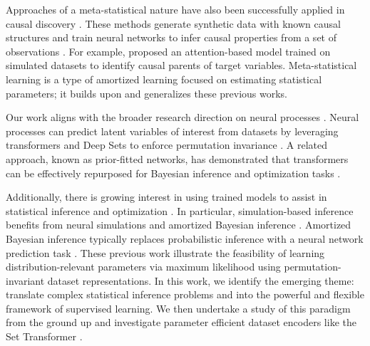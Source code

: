 Approaches of a meta-statistical nature have also been successfully applied in causal discovery \cite{lopez2015towards, lowe2022amortized, lorch2022amortized, wu2024sample}. These methods generate synthetic data with known causal structures and train neural networks to infer causal properties from a set of observations \cite{kelearning}. For example, \citet{kim2024targeted} proposed an attention-based model trained on simulated datasets to identify causal parents of target variables. Meta-statistical learning is a type of amortized learning focused on estimating statistical parameters; it builds upon and generalizes these previous works. 

Our work aligns with the broader research direction on neural processes \cite{garnelo2018neural, garnelo2018conditional,kim2019attentive, Gordon:2020, markou2022practical, huang2023practical, BruinsmaMRFAVBH23}. Neural processes can predict latent variables of interest from datasets \cite{chang2025amortized} by leveraging transformers \cite{pmlr-v162-nguyen22b} and Deep Sets \cite{NIPS2017_f22e4747} to enforce permutation invariance \cite{JMLR:v21:19-322}. A related approach, known as prior-fitted networks, has demonstrated that transformers can be effectively repurposed for Bayesian inference \cite{muller2022transformers} and optimization tasks \cite{pmlr-v202-muller23a}.

Additionally, there is growing interest in using trained models to assist in statistical inference \cite{angelopoulos2023predictionpoweredinference} and optimization \cite{NIPS2017_addfa9b7, NEURIPS2020_f52db9f7, NEURIPS2021_56c3b2c6, amos2023tutorialamortizedoptimization}. In particular, simulation-based inference benefits from neural simulations \cite{pmlr-v89-papamakarios19a, cranmer2020frontier} and amortized Bayesian inference \cite{gonccalves2020training, elsemueller2024sensitivity, radev2020bayesflow, avecilla2022neural, pmlr-v235-gloeckler24a}. Amortized Bayesian inference typically replaces probabilistic inference with a neural network prediction task \cite{chan2018likelihood, chen2023learning, chen2020neural}. These previous work illustrate the feasibility of learning distribution-relevant parameters via maximum likelihood using permutation-invariant dataset representations. In this work, we identify the emerging theme: translate complex statistical inference problems and into the powerful and flexible framework of supervised learning. We then undertake a study of this paradigm from the ground up and investigate parameter efficient dataset encoders like the Set Transformer \cite{lee2019set,zhang2022set}.

